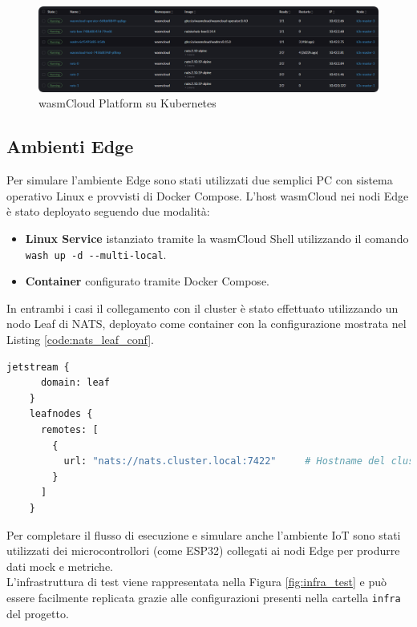\FloatBarrier
\begin{figure}[h]
    \centering
    \includegraphics[width=\textwidth]{img/wasmcloud_platform_rancher.png}
    \caption{wasmCloud Platform su Kubernetes}
    \label{fig:wasmcloud_platform}
\end{figure}
\FloatBarrier


\subsection{Ambienti Edge}

Per simulare l'ambiente Edge sono stati utilizzati due semplici PC con sistema operativo Linux e provvisti di Docker Compose. L'host wasmCloud nei nodi Edge è stato deployato seguendo due modalità:
\begin{itemize}
    \item \textbf{Linux Service} istanziato tramite la wasmCloud Shell utilizzando il comando \lstinline{wash up -d --multi-local}.
    \item \textbf{Container} configurato tramite Docker Compose.
\end{itemize}

In entrambi i casi il collegamento con il cluster è stato effettuato utilizzando un nodo Leaf di NATS, deployato come container con la configurazione mostrata nel Listing \ref{code:nats_leaf_conf}.

\begin{lstlisting}[language=Python, caption={Configurazione nodo Leaf NATS}, captionpos=b, label={code:nats_leaf_conf}]
    jetstream {
      domain: leaf
    }
    leafnodes {
      remotes: [
        {
          url: "nats://nats.cluster.local:7422"     # Hostname del cluster NATS situato su Kubernetes
        }
      ]
    }
\end{lstlisting}

Per completare il flusso di esecuzione e simulare anche l'ambiente IoT sono stati utilizzati dei microcontrollori (come ESP32) collegati ai nodi Edge per produrre dati mock e metriche.\\
L'infrastruttura di test viene rappresentata nella Figura \ref{fig:infra_test} e può essere facilmente replicata grazie alle configurazioni presenti nella cartella \texttt{infra} del progetto.

